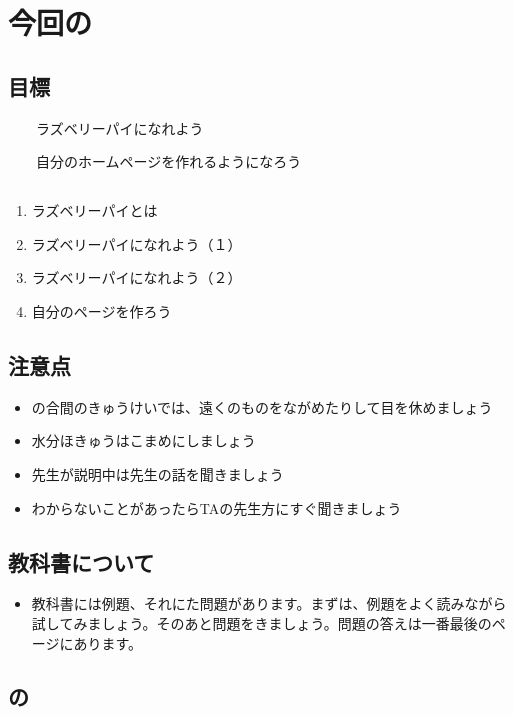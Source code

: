 \documentclass[a4paper,12pt]{jarticle}
\begin{document}
\section{今回の}
\subsection{目標}
\ \ \ \ ラズベリーパイになれよう

\ \ \ \ 自分のホームページを作れるようになろう

\subsection{}
\begin{enumerate}
  \item ラズベリーパイとは
  \item ラズベリーパイになれよう（１）
  \item ラズベリーパイになれよう（２）
  \item 自分のページを作ろう
\end{enumerate}
\subsection{注意点}
\begin{itemize}
  \item
      の合間のきゅうけいでは、遠くのものをながめたりして目を休めましょう
  \item 水分ほきゅうはこまめにしましょう
  \item
        先生が説明中は先生の話を聞きましょう
  \item
        わからないことがあったらTAの先生方にすぐ聞きましょう
\end{itemize}
\subsection{教科書について}
\begin{itemize}
  \item
        教科書には例題、それにた問題があります。まずは、例題をよく読みながら試してみましょう。そのあと問題をきましょう。問題の答えは一番最後のページにあります。
\end{itemize}
\clearpage\subsection{の}
\end{document}
